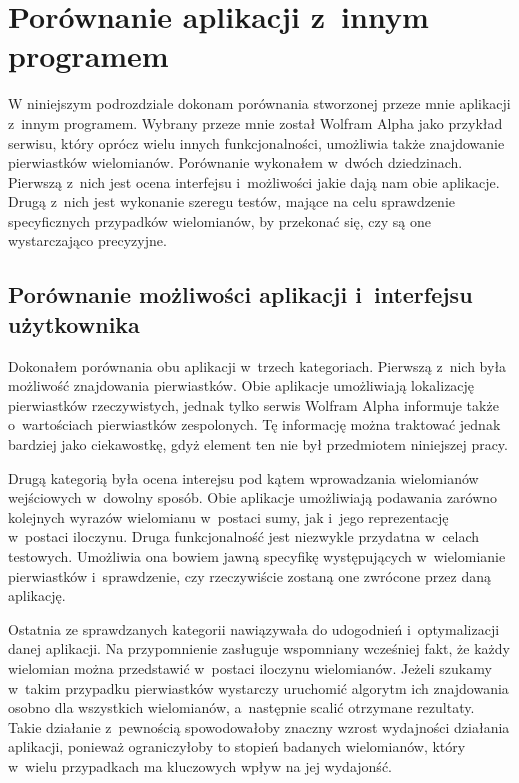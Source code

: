 \section {Porównanie aplikacji z~innym programem}

W niniejszym podrozdziale dokonam porównania stworzonej przeze mnie aplikacji z~innym programem. Wybrany przeze mnie został Wolfram Alpha jako przykład serwisu, który oprócz wielu innych funkcjonalności, umożliwia także znajdowanie pierwiastków wielomianów. Porównanie wykonałem w~dwóch dziedzinach. Pierwszą z~nich jest ocena interfejsu i~możliwości jakie dają nam obie aplikacje. Drugą z~nich jest wykonanie szeregu testów, mające na celu sprawdzenie specyficznych przypadków wielomianów, by przekonać się, czy są one wystarczająco precyzyjne.

\subsection {Porównanie możliwości aplikacji i~interfejsu użytkownika}

Dokonałem porównania obu aplikacji w~trzech kategoriach. Pierwszą z~nich była możliwość znajdowania pierwiastków. Obie aplikacje umożliwiają lokalizację pierwiastków rzeczywistych, jednak tylko serwis Wolfram Alpha informuje także o~wartościach pierwiastków zespolonych. Tę informację można traktować jednak bardziej jako ciekawostkę, gdyż element ten nie był przedmiotem niniejszej pracy.

Drugą kategorią była ocena interejsu pod kątem wprowadzania wielomianów wejściowych w~dowolny sposób. Obie aplikacje umożliwiają podawania zarówno kolejnych wyrazów wielomianu w~postaci sumy, jak i~jego reprezentację w~postaci iloczynu. Druga funkcjonalność jest niezwykle przydatna w~celach testowych. Umożliwia ona bowiem jawną specyfikę występujących w~wielomianie pierwiastków i~sprawdzenie, czy rzeczywiście zostaną one zwrócone przez daną aplikację.

Ostatnia ze sprawdzanych kategorii nawiązywała do udogodnień i~optymalizacji danej aplikacji. Na przypomnienie zasługuje wspomniany wcześniej fakt, że każdy wielomian można przedstawić w~postaci iloczynu wielomianów. Jeżeli szukamy w~takim przypadku pierwiastków wystarczy uruchomić algorytm ich znajdowania osobno dla wszystkich wielomianów, a~następnie scalić otrzymane rezultaty. Takie działanie z~pewnością spowodowałoby znaczny wzrost wydajności działania aplikacji, ponieważ ograniczyłoby to stopień badanych wielomianów, który w~wielu przypadkach ma kluczowych wpływ na jej wydajonść.

